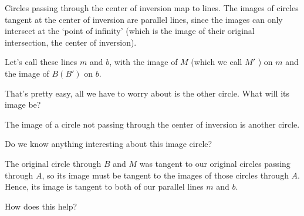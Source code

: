 

Circles passing through the center of inversion map to lines.  The images of circles tangent at the center of inversion are parallel lines, since the images can only intersect at the `point of infinity' (which is the image of their original intersection, the center of inversion).

Let's call these lines $m$ and $b$, with the image of $M$ (which we call $M'$ ) on $m$ and the image of $B (B' )$ on $b$.

That's pretty easy, all we have to worry about is the other circle.  What will its image be?





The image of a circle not passing through the center of inversion is another circle.

Do we know anything interesting about this image circle?



The original circle through $B$ and $M$ was tangent to our original circles passing through $A$, so its image must be tangent to the images of those circles through $A$.  Hence, its image is tangent to both of our parallel lines $m$ and $b$.

How does this help?


